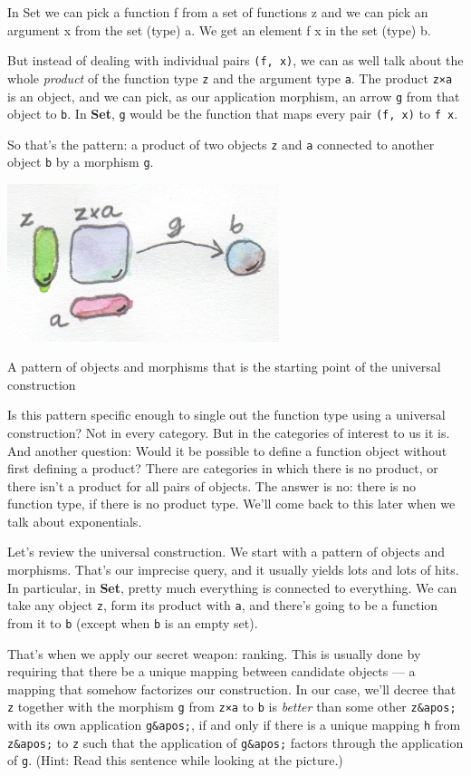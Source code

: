 In Set we can pick a function f from a set of functions z and we can
pick an argument x from the set (type) a. We get an element f x in the
set (type) b.

But instead of dealing with individual pairs \texttt{(f,\ x)}, we can as
well talk about the whole \emph{product} of the function type \texttt{z}
and the argument type \texttt{a}. The product \texttt{z×a} is an object,
and we can pick, as our application morphism, an arrow \texttt{g} from
that object to \texttt{b}. In \textbf{Set}, \texttt{g} would be the
function that maps every pair \texttt{(f,\ x)} to \texttt{f\ x}.

So that's the pattern: a product of two objects \texttt{z} and
\texttt{a} connected to another object \texttt{b} by a morphism
\texttt{g}.

\hypertarget{attachment_4244}{}
\includegraphics[width=3.12500in]{images/functionpattern.jpg}

A pattern of objects and morphisms that is the starting point of the
universal construction

Is this pattern specific enough to single out the function type using a
universal construction? Not in every category. But in the categories of
interest to us it is. And another question: Would it be possible to
define a function object without first defining a product? There are
categories in which there is no product, or there isn't a product for
all pairs of objects. The answer is no: there is no function type, if
there is no product type. We'll come back to this later when we talk
about exponentials.

Let's review the universal construction. We start with a pattern of
objects and morphisms. That's our imprecise query, and it usually yields
lots and lots of hits. In particular, in \textbf{Set}, pretty much
everything is connected to everything. We can take any object
\texttt{z}, form its product with \texttt{a}, and there's going to be a
function from it to \texttt{b} (except when \texttt{b} is an empty set).

That's when we apply our secret weapon: ranking. This is usually done by
requiring that there be a unique mapping between candidate objects --- a
mapping that somehow factorizes our construction. In our case, we'll
decree that \texttt{z} together with the morphism \texttt{g} from
\texttt{z×a} to \texttt{b} is \emph{better} than some other
\texttt{z\&apos;} with its own application \texttt{g\&apos;}, if and
only if there is a unique mapping \texttt{h} from \texttt{z\&apos;} to
\texttt{z} such that the application of \texttt{g\&apos;} factors
through the application of \texttt{g}. (Hint: Read this sentence while
looking at the picture.)

